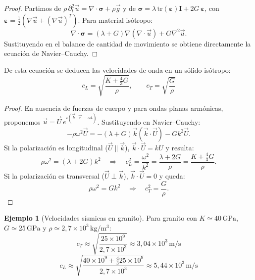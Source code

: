 \documentclass[12pt, a4paper]{article}
\theoremstyle{plain}
\theoremstyle{definition}
\newtheorem{ejemplo}{Ejemplo}[section]
\theoremstyle{remark}
\newcommand{\ve}[1]{\vec{#1}}
\begin{document}
\begin{proof}
Partimos de $\rho\,\partial_t^2\ve{u}=\nabla\cdot\boldsymbol{\sigma}+\rho\ve{g}$ y de
$\boldsymbol{\sigma}=\lambda\,\mathrm{tr}(\boldsymbol{\varepsilon})\mathbf{I}
+2G\,\boldsymbol{\varepsilon}$, con
$\boldsymbol{\varepsilon}=\tfrac12(\nabla\ve{u}+(\nabla\ve{u})^T)$. Para material isótropo:
\begin{equation}
  \nabla\cdot\boldsymbol{\sigma}
  =(\lambda+G)\nabla(\nabla\cdot\ve{u})+G\nabla^2\ve{u}.
\end{equation}
Sustituyendo en el balance de cantidad de movimiento se obtiene directamente la ecuación de
Navier--Cauchy.
\end{proof}

De esta ecuación se deducen las velocidades de onda en un sólido isótropo:
\begin{equation}
  c_L=\sqrt{\frac{K+\frac{4}{3}G}{\rho}},
  \qquad
  c_T=\sqrt{\frac{G}{\rho}}
\end{equation}

\begin{proof}
En ausencia de fuerzas de cuerpo y para ondas planas armónicas, proponemos
$\ve{u}=\ve{U}\,e^{i(\ve{k}\cdot\ve{r}-\omega t)}$.
Sustituyendo en Navier--Cauchy:
\begin{equation}
  -\rho\omega^2\ve{U}
  =-(\lambda+G)\ve{k}(\ve{k}\cdot\ve{U})-Gk^2\ve{U}.
\end{equation}
Si la polarización es longitudinal ($\ve{U}\parallel\ve{k}$),
$\ve{k}\cdot\ve{U}=kU$ y resulta:
\begin{equation}
  \rho\omega^2=(\lambda+2G)k^2
  \quad\Rightarrow\quad
  c_L^2=\frac{\omega^2}{k^2}=\frac{\lambda+2G}{\rho}
  =\frac{K+\frac{4}{3}G}{\rho}.
\end{equation}
Si la polarización es transversal ($\ve{U}\perp\ve{k}$),
$\ve{k}\cdot\ve{U}=0$ y queda:
\begin{equation}
  \rho\omega^2=Gk^2
  \quad\Rightarrow\quad
  c_T^2=\frac{G}{\rho}.
\end{equation}
\end{proof}
\begin{ejemplo}[Velocidades sísmicas en granito]
Para granito con $K\simeq 40\,\mathrm{GPa}$, $G\simeq 25\,\mathrm{GPa}$ y
$\rho\simeq 2{,}7\times10^3\,\mathrm{kg/m^3}$:
\begin{equation}
  c_T \approx \sqrt{\frac{25\times10^9}{2{,}7\times10^3}}
  \approx 3{,}04\times10^3\,\mathrm{m/s}
\end{equation}
\begin{equation}
  c_L \approx \sqrt{\frac{40\times10^9+\frac{4}{3}25\times10^9}{2{,}7\times10^3}}
  \approx 5{,}44\times10^3\,\mathrm{m/s}
\end{equation}
\end{ejemplo}
\end{document}
